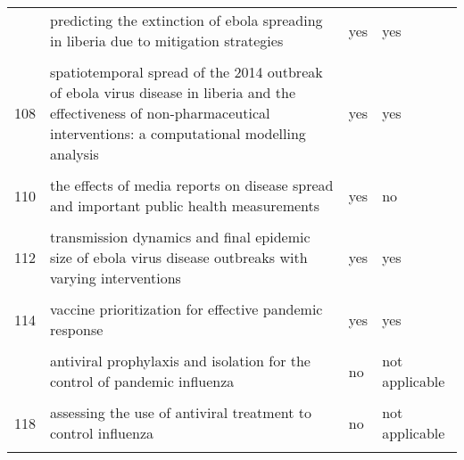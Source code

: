 \documentclass[
]{article}
\begin{document}
\begin{landscape}
\begin{longtable}{l>{\raggedright\arraybackslash}p{9cm}ll}
\addlinespace
106 & predicting the extinction of ebola spreading in liberia due to mitigation strategies & yes & yes\\
\cellcolor{gray!6}{107} & \cellcolor{gray!6}{school closure strategies for the 2009 hong kong hini influenza pandemic} & \cellcolor{gray!6}{no} & \cellcolor{gray!6}{not applicable}\\
108 & spatiotemporal spread of the 2014 outbreak of ebola virus disease in liberia and the effectiveness of non-pharmaceutical interventions: a computational modelling analysis & yes & yes\\
\cellcolor{gray!6}{109} & \cellcolor{gray!6}{strategies for early vaccination during novel influenza outbreaks} & \cellcolor{gray!6}{yes} & \cellcolor{gray!6}{no}\\
110 & the effects of media reports on disease spread and important public health measurements & yes & no\\
\addlinespace
\cellcolor{gray!6}{111} & \cellcolor{gray!6}{the impact of human behavioral changes in 2014 west africa ebola outbreak} & \cellcolor{gray!6}{yes} & \cellcolor{gray!6}{yes}\\
112 & transmission dynamics and final epidemic size of ebola virus disease outbreaks with varying interventions & yes & yes\\
\cellcolor{gray!6}{113} & \cellcolor{gray!6}{treatment–donation-stockpile dynamics in ebola convalescent blood transfusion therapy} & \cellcolor{gray!6}{no} & \cellcolor{gray!6}{not applicable}\\
114 & vaccine prioritization for effective pandemic response & yes & yes\\
\cellcolor{gray!6}{115} & \cellcolor{gray!6}{a mathematical study of a tb model with treatment interruptions and two latent periods} & \cellcolor{gray!6}{no} & \cellcolor{gray!6}{not applicable}\\
\addlinespace
116 & antiviral prophylaxis and isolation for the control of pandemic influenza & no & not applicable\\
\cellcolor{gray!6}{117} & \cellcolor{gray!6}{assessing the impact of travel restrictions on international spread of the 2014 west african ebola epidemic} & \cellcolor{gray!6}{yes} & \cellcolor{gray!6}{yes}\\
118 & assessing the use of antiviral treatment to control influenza & no & not applicable\\
\cellcolor{gray!6}{119} & \cellcolor{gray!6}{behavior in the time of cholera: evidence from the 2008-2009 cholera outbreak in zimbabwe} & \cellcolor{gray!6}{yes} & \cellcolor{gray!6}{no}\\

\end{longtable}
\end{landscape}
\end{document}
